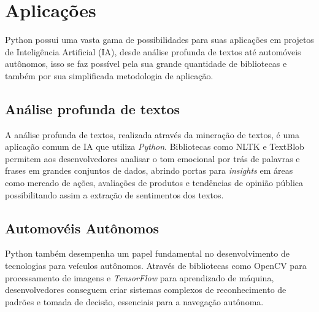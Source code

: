 
\section{Aplicações}

Python possui uma vasta gama de possibilidades para suas aplicações em projetos de Inteligência Artificial (IA), desde análise profunda de textos até automóveis autônomos, isso se faz possível pela sua grande quantidade de bibliotecas e também por sua simplificada metodologia de aplicação.\cite{didatica2024}

\subsection{Análise profunda de textos}

A análise profunda de textos, realizada através da mineração de textos, é uma aplicação comum de IA que utiliza \textit{Python}. Bibliotecas como NLTK e TextBlob permitem aos desenvolvedores analisar o tom emocional por trás de palavras e frases em grandes conjuntos de dados, abrindo portas para \textit{insights} em áreas como mercado de ações, avaliações de produtos e tendências de opinião pública possibilitando assim a extração de sentimentos dos textos.\cite{didatica2024}

\subsection{Automovéis Autônomos}

Python também desempenha um papel fundamental no desenvolvimento de tecnologias para veículos autônomos. Através de bibliotecas como OpenCV para processamento de imagens e \textit{TensorFlow} para aprendizado de máquina, desenvolvedores conseguem criar sistemas complexos de reconhecimento de padrões e tomada de decisão, essenciais para a navegação autônoma.\cite{didatica2024}